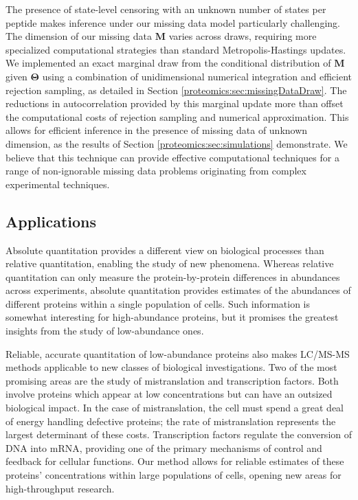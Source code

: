 The presence of state-level censoring with an unknown number of states per peptide makes inference under our missing data model particularly challenging.
The dimension of our missing data $\bm M$ varies across draws, requiring more specialized computational strategies than standard Metropolis-Hastings updates.
We implemented an exact marginal draw from the conditional distribution of $\bm M$ given $\bm \Theta$ using a combination of unidimensional numerical integration and efficient rejection sampling, as detailed in Section \ref{proteomics:sec:missingDataDraw}.
The reductions in autocorrelation provided by this marginal update more than offset the computational costs of rejection sampling and numerical approximation.
This allows for efficient inference in the presence of missing data of unknown dimension, as the results of Section \ref{proteomics:sec:simulations} demonstrate.
We believe that this technique can provide effective computational techniques for a range of non-ignorable missing data problems originating from complex experimental techniques.

\subsection{Applications}

Absolute quantitation provides a different view on biological processes than relative quantitation, enabling the study of new phenomena.
Whereas relative quantitation can only measure the protein-by-protein differences in abundances across experiments, absolute quantitation provides estimates of the abundances of different proteins within a single population of cells.
Such information is somewhat interesting for high-abundance proteins, but it promises the greatest insights from the study of low-abundance ones.

Reliable, accurate quantitation of low-abundance proteins also makes LC/MS-MS methods applicable to new classes of biological investigations.
Two of the most promising areas are the study of mistranslation and transcription factors.
Both involve proteins which appear at low concentrations but can have an outsized biological impact.
In the case of mistranslation, the cell must spend a great deal of energy handling defective proteins; the rate of mistranslation represents the largest determinant of these costs.
Transcription factors regulate the conversion of DNA into mRNA, providing one of the primary mechanisms of control and feedback for cellular functions.
Our method allows for reliable estimates of these proteins' concentrations within large populations of cells, opening new areas for high-throughput research.

